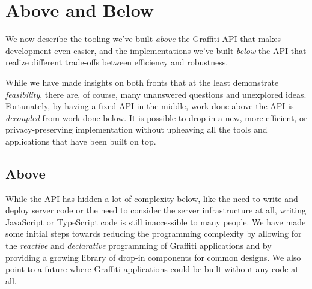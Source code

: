 \section{Above and Below}
\label{above-and-below}

We now describe the tooling we've built \emph{above}
the Graffiti API that makes development even easier, and
the implementations we've built \emph{below} the API
that realize different trade-offs between efficiency and
robustness.

While we have made insights on both fronts that at
the least demonstrate \emph{feasibility},
there are, of course,
many unanswered questions and unexplored ideas.
Fortunately, by having a fixed API in the middle, work done above the API
is \emph{decoupled} from work done below.
It is possible to drop in a new, more efficient, or privacy-preserving implementation
without upheaving all the tools and applications that have been built on top.


\subsection{Above}

While the API has hidden a lot of complexity below,
like the need to write and deploy server code or the need to
consider the server infrastructure at all,
writing JavaScript or TypeScript code is still inaccessible
to many people.
We have made some initial steps towards reducing the
programming complexity by allowing for the \emph{reactive} and
\emph{declarative} programming of Graffiti applications
and by providing a growing library of drop-in components for common designs.
We also point to a future where Graffiti applications could be built
without any code at all.

